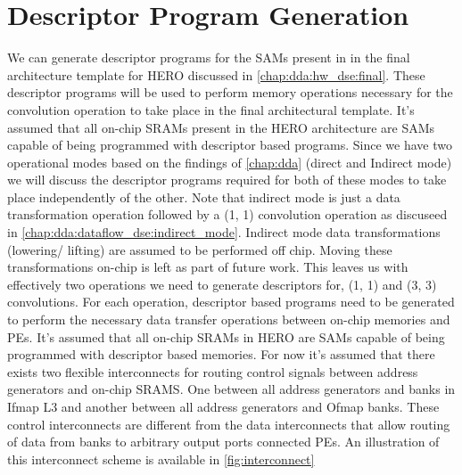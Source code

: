 \clearpage

\section{Descriptor Program Generation}
\label{chap:sams:acc_scheduling}

We can generate descriptor programs for the SAMs present in
in the final architecture template for HERO discussed in \autoref{chap:dda:hw_dse:final}.
These descriptor programs will be used to perform memory operations necessary
for the convolution operation to take place in the final architectural template.
It's assumed that all on-chip SRAMs present in the HERO architecture are SAMs
capable of being programmed with descriptor based programs.   
Since we have two operational modes based on the findings of
\autoref{chap:dda} (direct and Indirect mode) we will discuss the
descriptor programs required for both of these modes to take place independently of
the other. Note that indirect mode is just a data transformation operation
followed by a (1, 1) convolution operation as discuseed in
\autoref{chap:dda:dataflow_dse:indirect_mode}. Indirect mode data
transformations (lowering/ lifting) are assumed to be performed off chip. Moving
these transformations on-chip is left as part of future work. This leaves us
with effectively two operations we need to generate descriptors for, (1, 1) and (3, 3)
convolutions. For each operation, descriptor based programs need to be generated
to perform the necessary data transfer operations between on-chip memories and
PEs. It's assumed that all on-chip SRAMs in HERO are SAMs capable of being
programmed with descriptor based memories. 
For now it's assumed that there exists two flexible interconnects for routing
control signals between address generators and on-chip SRAMS. One between all
address generators and banks in Ifmap L3 and another between all address
generators and Ofmap banks. These control interconnects are different from the
data interconnects that allow routing of data from banks to arbitrary output
ports connected PEs. An illustration of this interconnect scheme is available in
\autoref{fig:interconnect}

